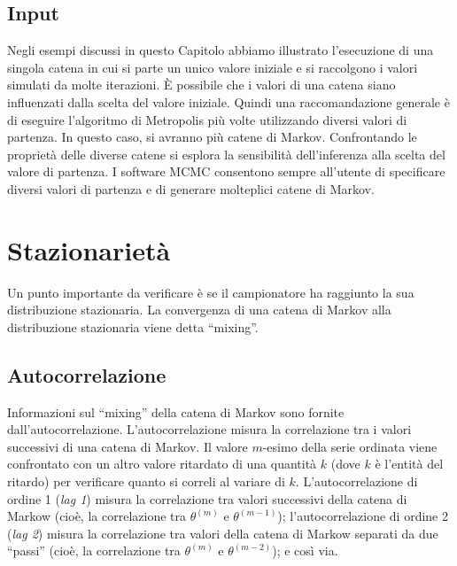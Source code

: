 \documentclass[
  10pt,
  italian,
  a4paper,
  extrafontsizes,onecolumn,openright
  ]{memoir}
\begin{document}
\hypertarget{input}{%
\subsection{Input}\label{input}}

Negli esempi discussi in questo Capitolo abbiamo illustrato l'esecuzione di una singola catena in cui si parte un unico valore iniziale e si raccolgono i valori simulati da molte iterazioni. È possibile che i valori di una catena siano influenzati dalla scelta del valore iniziale. Quindi una raccomandazione generale è di eseguire l'algoritmo di Metropolis più volte utilizzando diversi valori di partenza. In questo caso, si avranno più catene di Markov. Confrontando le proprietà delle diverse catene si esplora la sensibilità dell'inferenza alla scelta del valore di partenza. I software MCMC consentono sempre all'utente di specificare diversi valori di partenza e di generare molteplici catene di Markov.

\hypertarget{stazionarietuxe0}{%
\section{Stazionarietà}\label{stazionarietuxe0}}

Un punto importante da verificare è se il campionatore ha raggiunto la sua distribuzione stazionaria. La convergenza di una catena di Markov alla distribuzione stazionaria viene detta ``mixing''.

\hypertarget{approx-post-autocor}{%
\subsection{Autocorrelazione}\label{approx-post-autocor}}

Informazioni sul ``mixing'' della catena di Markov sono fornite dall'autocorrelazione. L'autocorrelazione misura la correlazione tra i valori successivi di una catena di Markov. Il valore \(m\)-esimo della serie ordinata viene confrontato con un altro valore ritardato di una quantità \(k\) (dove \(k\) è l'entità del ritardo) per verificare quanto si correli al variare di \(k\). L'autocorrelazione di ordine 1 (\emph{lag 1}) misura la correlazione tra valori successivi della catena di Markow (cioè, la correlazione tra \(\theta^{(m)}\) e \(\theta^{(m-1)}\)); l'autocorrelazione di ordine 2 (\emph{lag 2}) misura la correlazione tra valori della catena di Markow separati da due ``passi'' (cioè, la correlazione tra \(\theta^{(m)}\) e \(\theta^{(m-2)}\)); e così via.
\end{document}
